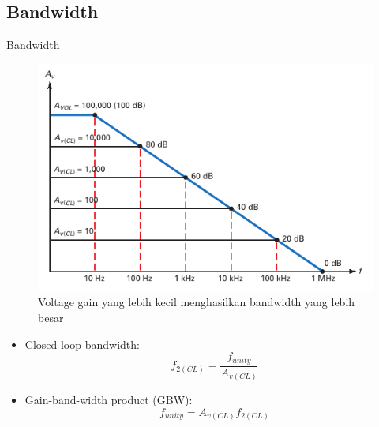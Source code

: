 \subsection{Bandwidth}



\begin{frame}{Bandwidth}
	\begin{multicols}{2}
		\begin{figure}
			\centering
			\includegraphics[height=0.6\textheight]{gambar/fig-16.15}
			\caption{Voltage gain yang lebih kecil menghasilkan bandwidth yang lebih besar}
			\label{fig-16.15}
		\end{figure}
	\columnbreak
		\begin{itemize}
			\item Closed-loop bandwidth:
			\begin{equation}\label{pers.16.5}
				f_{2(CL)} = \frac{f_{unity}}{A_{v(CL)}}
			\end{equation}
			\item Gain-band-width product (GBW):
			\begin{equation}\label{pers.16.6}
				f_{unity} = A_{v(CL)}f_{2(CL)}
			\end{equation}
		\end{itemize}
	\end{multicols}
\end{frame}

